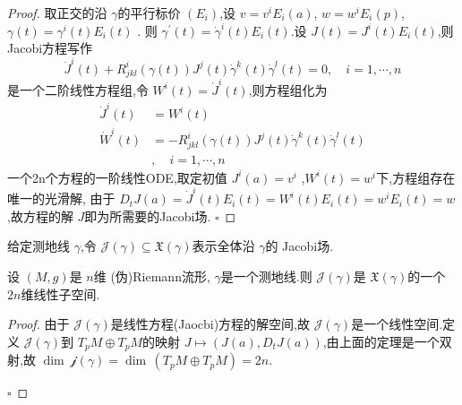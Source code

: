 \documentclass[../../几何与拓扑.tex]{subfiles}
\begin{document}
\begin{proof}
    取正交的沿  \(   \gamma   \)的平行标价 \(  \left( E_{i} \right)   \),设 \(  v =  v^{i}E_{i} \left( a \right)  \),    \(  w =  w^{i}E_{i}\left( p \right)   \), \(   \gamma \left( t \right)=  \gamma ^{i}\left( t \right)E_{i}\left( t \right)     \) . 则 \(   \gamma ^{\prime} \left( t \right) =   \dot{\gamma}^{i}\left( t \right)E_{i}\left( t \right)     \).设 \(  J\left( t \right)= J^{i}\left( t \right)E_{i}\left( t \right)     \),则 Jacobi方程写作 \[
    \ddot{J}^{i}\left( t \right) + R_{jkl}^{i}\left(  \gamma \left( t \right)  \right) J^{j}\left( t \right) \dot{\gamma}^{k}\left( t \right) \dot{\gamma}^{l}\left( t \right)= 0    ,\quad i=  1,\cdots,n 
    \]     是一个二阶线性方程组,令 \(  W^{i}\left( t \right) = \dot{J}^{i}\left( t \right)   \),则方程组化为 \[
    \begin{aligned}
        \dot{J}^{i}\left( t \right)&= W^{i}\left( t \right)  \\ 
         \dot{W}^{i}\left( t \right)&= -R_{jkl}^{i}\left(  \gamma \left( t \right)  \right)J^{j}\left( t \right) \dot{\gamma}^{k}\left( t \right) \dot{\gamma}^{l}\left( t \right)\\ 
       &,\quad    i=  1,\cdots,n      
    \end{aligned}
    \] 一个2n个方程的一阶线性ODE,取定初值 \(  J^{i}\left( a \right)=   v^{i}  \) ,\(  W^{i}\left( t \right)= w^{i}   \)下,方程组存在唯一的光滑解,
    由于 \( D_{t}J\left( a \right)= \dot{J}^{i}\left( t \right)E_{i}\left( t \right)= W^{i}\left( t \right)E_{i}\left( t \right)= w^{i}E_{i}\left( t \right)= w         \)  ,故方程的解 \(  J  \)即为所需要的Jacobi场.  
    \hfill $\square$
\end{proof}
\begin{definition}
    给定测地线 \(   \gamma   \),令 \( \mathscr{J}\left(  \gamma  \right)\subseteq \mathfrak{X}\left(  \gamma  \right)    \)表示全体沿 \(   \gamma   \)的 Jacobi场.   
\end{definition}

\begin{corollary}
    设 \(  \left( M,g \right)   \)是 \(  n  \)维 (伪)Riemann流形, \(   \gamma   \)是一个测地线.则 \(  \mathscr{J}\left(  \gamma  \right)   \)是 \(  \mathfrak{X}\left(  \gamma  \right)   \)的一个 \(  2n  \)维线性子空间.   
\end{corollary}
\begin{proof}
    由于 \(  \mathscr{J}\left(  \gamma  \right)   \)是线性方程(Jaocbi)方程的解空间,故 \(  \mathscr{J}\left(  \gamma  \right)   \)是一个线性空间.定义 \(  \mathscr{J}\left(  \gamma  \right)   \)到 \(  T_{p}M\oplus T_{p}M  \)的映射 \(  J\mapsto \left( J\left( a \right),D_{t}J\left( a \right)   \right)   \),由上面的定理是一个双射,故 \(  \operatorname{dim}\,\mathscr{j}\left(  \gamma  \right)= \operatorname{dim}\,\left( T_{p}M\oplus T_{p}M \right)= 2n    \).      

    \hfill $\square$
\end{proof}
\end{document}
